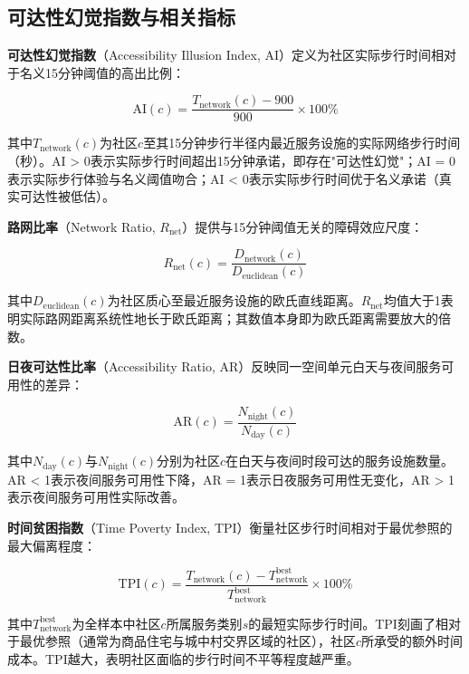 \documentclass[10pt,conference]{IEEEtran}
\begin{document}
\subsection{可达性幻觉指数与相关指标}

\textbf{可达性幻觉指数}（Accessibility Illusion Index, AI）定义为社区实际步行时间相对于名义15分钟阈值的高出比例：

\begin{equation}
\text{AI}(c) = \frac{T_{\text{network}}(c) - 900}{900} \times 100\%
\end{equation}

其中$T_{\text{network}}(c)$为社区$c$至其15分钟步行半径内最近服务设施的实际网络步行时间（秒）。AI > 0表示实际步行时间超出15分钟承诺，即存在"可达性幻觉"；AI = 0表示实际步行体验与名义阈值吻合；AI < 0表示实际步行时间优于名义承诺（真实可达性被低估）。

\textbf{路网比率}（Network Ratio, $R_{\text{net}}$）提供与15分钟阈值无关的障碍效应尺度：

\begin{equation}
R_{\text{net}}(c) = \frac{D_{\text{network}}(c)}{D_{\text{euclidean}}(c)}
\end{equation}

其中$D_{\text{euclidean}}(c)$为社区质心至最近服务设施的欧氏直线距离。$R_{\text{net}}$均值大于1表明实际路网距离系统性地长于欧氏距离；其数值本身即为欧氏距离需要放大的倍数。

\textbf{日夜可达性比率}（Accessibility Ratio, AR）反映同一空间单元白天与夜间服务可用性的差异：

\begin{equation}
\text{AR}(c) = \frac{N_{\text{night}}(c)}{N_{\text{day}}(c)}
\end{equation}

其中$N_{\text{day}}(c)$与$N_{\text{night}}(c)$分别为社区$c$在白天与夜间时段可达的服务设施数量。AR < 1表示夜间服务可用性下降，AR = 1表示日夜服务可用性无变化，AR > 1表示夜间服务可用性实际改善。

\textbf{时间贫困指数}（Time Poverty Index, TPI）衡量社区步行时间相对于最优参照的最大偏离程度：

\begin{equation}
\text{TPI}(c) = \frac{T_{\text{network}}(c) - T_{\text{network}}^{\text{best}}}{T_{\text{network}}^{\text{best}}} \times 100\%
\end{equation}

其中$T_{\text{network}}^{\text{best}}$为全样本中社区$c$所属服务类别$s$的最短实际步行时间。TPI刻画了相对于最优参照（通常为商品住宅与城中村交界区域的社区），社区$c$所承受的额外时间成本。TPI越大，表明社区面临的步行时间不平等程度越严重。
\end{document}
